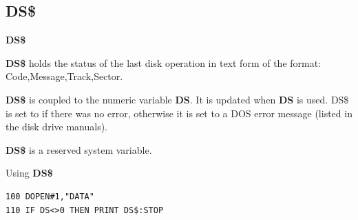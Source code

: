 
\newpage
\subsection{DS\$}
\begin{description}[leftmargin=2cm,style=nextline]
\item [Format:] {\bf DS\$}
\item [Usage:]  {\bf DS\$} holds the status of the last disk operation
                in text form of the format:
                Code,Message,Track,Sector.

                {\bf DS\$} is coupled to the numeric variable {\bf DS}.
                It is updated when {\bf DS} is used.
                DS\$ is set to  if there was no error, otherwise
                it is set to a DOS error message (listed in the
                disk drive manuals).
\item[Remarks:] {\bf DS\$} is a reserved system variable.

\item [Example:] Using {\bf DS\$}
\begin{tcolorbox}[colback=black,coltext=white]
\verbatimfont{\codefont}
\begin{verbatim}
100 DOPEN#1,"DATA"
110 IF DS<>0 THEN PRINT DS$:STOP
\end{verbatim}
\end{tcolorbox}
\end{description}


\newpage
